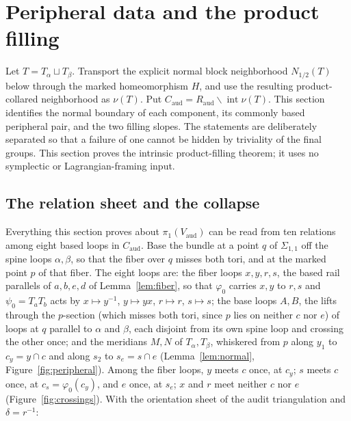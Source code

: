 \documentclass[11pt]{article}
\newcommand{\pione}{\pi_1}
\theoremstyle{definition}
\begin{document}
\section{Peripheral data and the product filling}\label{sec:peripheral}

Let $T=T_\alpha\sqcup T_\beta$.  Transport the explicit normal block
neighborhood $N_{1/2}(T)$ below through the marked homeomorphism $H$, and
use the resulting product-collared neighborhood as $\nu(T)$.  Put
$C_{\mathrm{aud}}=R_{\mathrm{aud}}\smallsetminus\operatorname{int}\nu(T)$.
This section identifies
the normal boundary of each component, its commonly based peripheral pair,
and the two filling slopes.  The statements are deliberately separated so
that a failure of one cannot be hidden by triviality of the final groups.
This section proves the intrinsic product-filling theorem; it uses no
symplectic or Lagrangian-framing input.

\subsection{The relation sheet and the collapse}\label{sec:sheet}

Everything this section proves about $\pione(V_{\mathrm{aud}})$ can be read
from ten relations among eight based loops in $C_{\mathrm{aud}}$.  Base the
bundle at a point $q$ of $\Sigma_{1,1}$ off the spine loops $\alpha,\beta$,
so that the fiber over $q$ misses both tori, and at the marked point $p$ of
that fiber.  The eight loops are: the fiber loops $x,y,r,s$, the based rail
parallels of $a,b,e,d$ of Lemma~\ref{lem:fiber}, so that $\varphi_0$ carries
$x,y$ to $r,s$ and $\psi_0=T_aT_b$ acts by $x\mapsto y^{-1}$,
$y\mapsto yx$, $r\mapsto r$, $s\mapsto s$; the base loops $A,B$, the lifts
through the $p$-section (which misses both tori, since $p$ lies on neither
$c$ nor $e$) of loops at $q$ parallel to $\alpha$ and $\beta$, each disjoint
from its own spine loop and crossing the other once; and the meridians
$M,N$ of $T_\alpha,T_\beta$, whiskered from $p$ along $y_1$ to
$c_y=y\cap c$ and along $s_2$ to $s_e=s\cap e$ (Lemma~\ref{lem:normal},
Figure~\ref{fig:peripheral}).  Among the fiber loops, $y$ meets $c$ once,
at $c_y$; $s$ meets $c$ once, at $c_s=\varphi_0(c_y)$, and $e$ once, at
$s_e$; $x$ and $r$ meet neither $c$ nor $e$ (Figure~\ref{fig:crossings}).
With the orientation sheet of the audit triangulation and $\delta=r^{-1}$:
\end{document}
